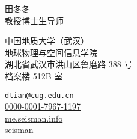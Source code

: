 \documentclass[11pt,a4paper]{article}
\makeatletter
\newcommand{\Name}{田冬冬}
\newcommand{\Role}{教授\hspace{0.5em}博士生导师}
\newcommand{\Email}{dtian@cug.edu.cn}
\newcommand{\Website}{me.seisman.info}
\newcommand{\Github}{seisman}
\newcommand{\Orcid}{0000-0001-7967-1197}
\newcommand{\Affiliation}{中国地质大学（武汉）\\ 地球物理与空间信息学院}
\newcommand{\Address}{湖北省武汉市洪山区鲁磨路 388 号\\ 档案楼 512B 室}
\makeatother
\begin{document}
\thispagestyle{empty} %
\begin{center}
\kaishu
{\fontsize{24pt}{0}\selectfont \Name \hspace{1ex}} \\[0.4cm]
{\fontsize{16pt}{0}\selectfont \Role} \\[0.2cm]
\end{center}
\begin{minipage}[t]{0.7\textwidth}
  \kaishu
  \fontsize{12pt}{15pt}\selectfont
  \Affiliation
  \\
  \Address
\end{minipage}
\begin{minipage}[t]{0.3\textwidth}
  \kaishu
  \fontsize{12pt}{15pt}\selectfont
  \begin{flushleft}
    \faEnvelope \href{mailto:\Email}{\texttt{\Email}}
    \\
    \faOrcid \href{https://orcid.org/\Orcid}{\Orcid}
    \\
    \faGlobe \href{https://\Website}{\Website}
    \\
    \faGithub \href{https://github.com/\Github}{\Github}
  \end{flushleft}
\end{minipage}
\vspace{0.2cm}














\end{document}
